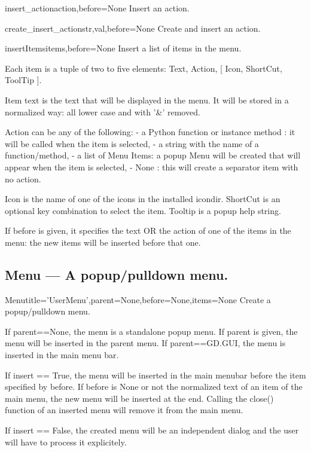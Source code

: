 \begin{funcdesc}{insert_action}{action,before=None}
Insert an action.
\end{funcdesc}

\begin{funcdesc}{create_insert_action}{str,val,before=None}
Create and insert an action.
\end{funcdesc}

\begin{funcdesc}{insertItems}{items,before=None}
Insert a list of items in the menu.
        
        Each item is a tuple of two to five elements:
           Text, Action, [ Icon,  ShortCut, ToolTip ].

        Item text is the text that will be displayed in the menu.
        It will be stored in a normalized way: all lower case and with
        '\&' removed.

        Action can be any of the following:
          - a Python function or instance method : it will be called when the
            item is selected,
          - a string with the name of a function/method,
          - a list of Menu Items: a popup Menu will be created that will appear
            when the item is selected,
          - None : this will create a separator item with no action.

        Icon is the name of one of the icons in the installed icondir.
        ShortCut is an optional key combination to select the item.
        Tooltip is a popup help string.

        If before is given, it specifies the text OR the action of one of the
        items in the menu: the new items will be inserted before that one.
        
\end{funcdesc}

\subsection{Menu --- A popup/pulldown menu.}


\begin{classdesc}{Menu}{title='UserMenu',parent=None,before=None,items=None}
Create a popup/pulldown menu.

        If parent==None, the menu is a standalone popup menu.
        If parent is given, the menu will be inserted in the parent menu.
        If parent==GD.GUI, the menu is inserted in the main menu bar.
        
        If insert == True, the menu will be inserted in the main menubar
        before the item specified by before.
        If before is None or not the normalized text of an item of the
        main menu, the new menu will be inserted at the end.
        Calling the close() function of an inserted menu will remove it
        from the main menu.

        If insert == False, the created menu will be an independent dialog
        and the user will have to process it explicitely.
        
\end{classdesc}

